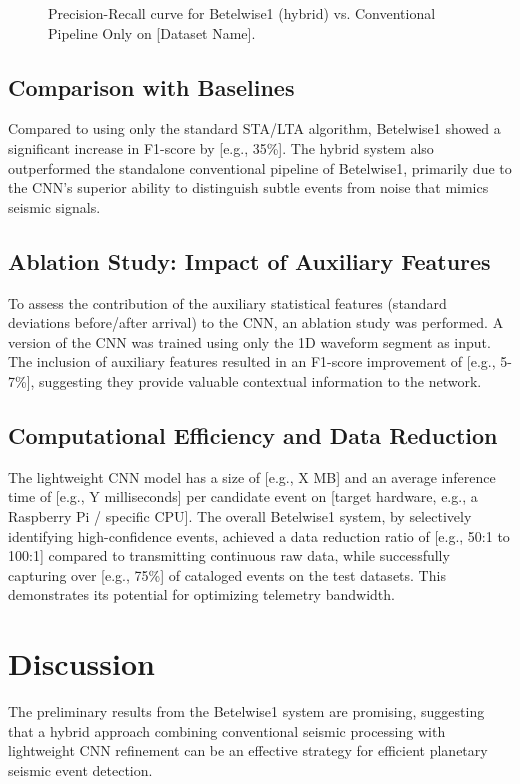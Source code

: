 \documentclass[11pt,a4paper]{article}
\begin{document}
\begin{figure}[H]
    \centering
    \caption{Precision-Recall curve for Betelwise1 (hybrid) vs. Conventional Pipeline Only on [Dataset Name].}
    \label{fig:pr_curve}
\end{figure}

\subsection{Comparison with Baselines}
Compared to using only the standard STA/LTA algorithm, Betelwise1 showed a significant increase in F1-score by [e.g., 35\%]. The hybrid system also outperformed the standalone conventional pipeline of Betelwise1, primarily due to the CNN's superior ability to distinguish subtle events from noise that mimics seismic signals.

\subsection{Ablation Study: Impact of Auxiliary Features}
To assess the contribution of the auxiliary statistical features (standard deviations before/after arrival) to the CNN, an ablation study was performed. A version of the CNN was trained using only the 1D waveform segment as input. The inclusion of auxiliary features resulted in an F1-score improvement of [e.g., 5-7\%], suggesting they provide valuable contextual information to the network.

\subsection{Computational Efficiency and Data Reduction}
The lightweight CNN model has a size of [e.g., X MB] and an average inference time of [e.g., Y milliseconds] per candidate event on [target hardware, e.g., a Raspberry Pi / specific CPU]. The overall Betelwise1 system, by selectively identifying high-confidence events, achieved a data reduction ratio of [e.g., 50:1 to 100:1] compared to transmitting continuous raw data, while successfully capturing over [e.g., 75\%] of cataloged events on the test datasets. This demonstrates its potential for optimizing telemetry bandwidth.

\section{Discussion}
The preliminary results from the Betelwise1 system are promising, suggesting that a hybrid approach combining conventional seismic processing with lightweight CNN refinement can be an effective strategy for efficient planetary seismic event detection.
\end{document}
